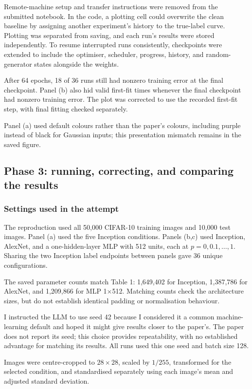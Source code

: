 \documentclass[11pt]{article}
\begin{document}
Remote-machine setup and transfer instructions were removed from the submitted notebook. In the code, a plotting cell could overwrite the clean baseline by assigning another experiment's history to the true-label curve. Plotting was separated from saving, and each run's results were stored independently. To resume interrupted runs consistently, checkpoints were extended to include the optimiser, scheduler, progress, history, and random-generator states alongside the weights.

After 64 epochs, 18 of 36 runs still had nonzero training error at the final checkpoint. Panel (b) also hid valid first-fit times whenever the final checkpoint had nonzero training error. The plot was corrected to use the recorded first-fit step, with final fitting checked separately.

Panel (a) used default colours rather than the paper's colours, including purple instead of black for Gaussian inputs; this presentation mismatch remains in the saved figure.

\subsection{Phase 3: running, correcting, and comparing the results}

\subsubsection{Settings used in the attempt}

The reproduction used all 50,000 CIFAR-10 training images and 10,000 test images. Panel (a) used the five Inception conditions. Panels (b,c) used Inception, AlexNet, and a one-hidden-layer MLP with 512 units, each at $p=0,0.1,\ldots,1$. Sharing the two Inception label endpoints between panels gave 36 unique configurations.

The saved parameter counts match Table 1: 1,649,402 for Inception, 1,387,786 for AlexNet, and 1,209,866 for MLP 1$\times$512. Matching counts check the architecture sizes, but do not establish identical padding or normalisation behaviour.

I instructed the LLM to use seed 42 because I considered it a common machine-learning default and hoped it might give results closer to the paper's. The paper does not report its seed; this choice provides repeatability, with no established advantage for matching its results. All runs used this one seed and batch size 128.

Images were centre-cropped to $28\times28$, scaled by $1/255$, transformed for the selected condition, and standardised separately using each image's mean and adjusted standard deviation.
\end{document}
